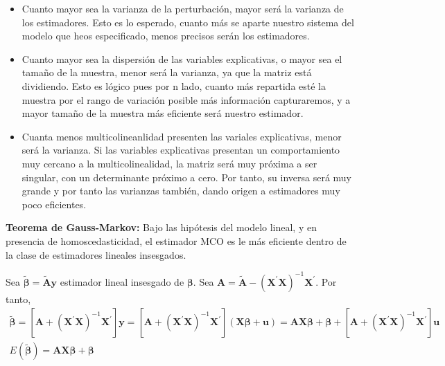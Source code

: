 \begin{itemize}
\item Cuanto mayor sea la varianza de la perturbaci\'on, mayor ser\'a la varianza de los estimadores. Esto es lo esperado, cuanto m\'as se aparte nuestro sistema del modelo que heos especificado, menos precisos ser\'an los estimadores.
\item Cuanto mayor sea la dispersi\'on de las variables explicativas, o mayor sea el tama\~no de la muestra, menor ser\'a la varianza, ya que la matriz est\'a dividiendo. Esto es l\'ogico pues por n lado, cuanto m\'as repartida est\'e la muestra por el rango de variaci\'on posible m\'as informaci\'on capturaremos, y a mayor tama\~no de la muestra m\'as eficiente ser\'a nuestro estimador.
\item Cuanta menos multicolineanlidad presenten las variales explicativas, menor ser\'a la varianza. Si las variables explicativas presentan un comportamiento muy cercano a la multicolinealidad, la matriz ser\'a muy pr\'oxima a ser singular, con un determinante pr\'oximo a cero. Por tanto, su inversa ser\'a muy grande y por tanto las varianzas tambi\'en, dando origen a estimadores muy poco eficientes.
\end{itemize}



\begin{teorema}
\textbf{Teorema de Gauss-Markov:} Bajo las hip\'otesis del modelo lineal, y en presencia de homoscedasticidad, el estimador MCO es le m\'as eficiente dentro de la clase de estimadores lineales insesgados.
\end{teorema}


Sea $\tilde{\boldsymbol{\beta}}=\tilde{\boldsymbol{A}}\boldsymbol{y}$
estimador lineal insesgado de $\boldsymbol{\beta}$. Sea $\boldsymbol{A}=\tilde{\boldsymbol{A}}-\left(\boldsymbol{X}^{\prime}\boldsymbol{X}\right)^{-1}\boldsymbol{X}^{\prime}$.
Por tanto,
\begin{equation*}
\begin{array}{c}
\tilde{\boldsymbol{\beta}}=\left[\boldsymbol{A}+\left(\boldsymbol{X}^{\prime}\boldsymbol{X}\right)^{-1}\boldsymbol{X}^{\prime}\right]\boldsymbol{y}=\left[\boldsymbol{A}+\left(\boldsymbol{X}^{\prime}\boldsymbol{X}\right)^{-1}\boldsymbol{X}^{\prime}\right]\left(\boldsymbol{X\beta}+\boldsymbol{u}\right)=\boldsymbol{A}\boldsymbol{X\beta}+\boldsymbol{\beta}+\left[\boldsymbol{A}+\left(\boldsymbol{X}^{\prime}\boldsymbol{X}\right)^{-1}\boldsymbol{X}^{\prime}\right]\boldsymbol{u}\\
E\left(\tilde{\boldsymbol{\beta}}\right)=\boldsymbol{A}\boldsymbol{X\beta}+\boldsymbol{\beta}
\end{array}
\end{equation*}


